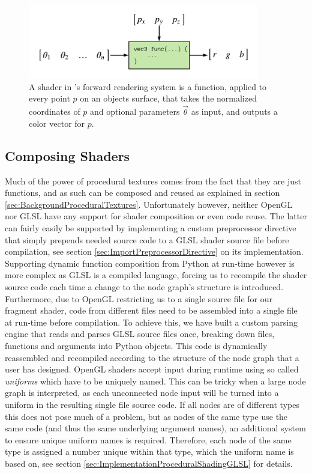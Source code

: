 \begin{figure}
    \centering
    \includegraphics[width=0.9\textwidth]{img/method/Shader Diagram.pdf}
    \caption{A shader in \dipter{}'s forward rendering system is a function, applied to every point $p$ on an objects surface, that takes the normalized coordinates of $p$ and optional parameters $\Vec{\theta}$ as input, and outputs a color vector for $p$.}
    \label{fig:OpenGLShader}
\end{figure}


\subsection{Composing Shaders}\label{sec:MethodComposingShaders}

Much of the power of procedural textures comes from the fact that they are just functions, and as such can be composed and reused as explained in section \ref{sec:BackgroundProceduralTextures}. Unfortunately however, neither OpenGL nor GLSL have any support for shader composition or even code reuse. The latter can fairly easily be supported by implementing a custom preprocessor directive that simply prepends needed source code to a GLSL shader source file before compilation, see section \ref{sec:ImportPreprocessorDirective} on its implementation. Supporting dynamic function composition from Python at run-time however is more complex as GLSL is a compiled language, forcing us to recompile the shader source code each time a change to the node graph's structure is introduced. Furthermore, due to OpenGL restricting us to a single source file for our fragment shader, code from different files need to be assembled into a single file at run-time before compilation. To achieve this, we have built a custom parsing engine that reads and parses GLSL source files once, breaking down files, functions and arguments into Python objects. This code is dynamically reassembled and recompiled according to the structure of the node graph that a user has designed. OpenGL shaders accept input during runtime using so called \textit{uniforms} which have to be uniquely named. This can be tricky when a large node graph is interpreted, as each unconnected node input will be turned into a uniform in the resulting single file source code. If all nodes are of different types this does not pose much of a problem, but as nodes of the same type use the same code (and thus the same underlying argument names), an additional system to ensure unique uniform names is required. Therefore, each node of the same type is assigned a number unique within that type, which the uniform name is based on, see section \ref{sec:ImplementationProceduralShadingGLSL} for details.


